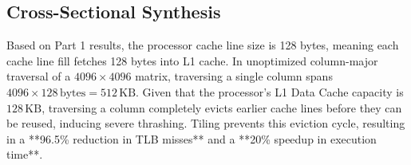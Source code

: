 \documentclass{article}
\begin{document}
	\begin{table}[htbp]
		\centering
		\caption{Hardware Counter Metrics Comparison}
		\label{tab:hardware_counters_comparison}
	\end{table}
	\FloatBarrier
	
	\subsection{Cross-Sectional Synthesis}
	Based on Part 1 results, the processor cache line size is 128 bytes, meaning each cache line fill fetches 128 bytes into L1 cache. In unoptimized column-major traversal of a $4096 \times 4096$ matrix, traversing a single column spans $4096 \times 128\,\text{bytes} = 512\,\text{KB}$. Given that the processor's L1 Data Cache capacity is $128\,\text{KB}$, traversing a column completely evicts earlier cache lines before they can be reused, inducing severe thrashing. Tiling prevents this eviction cycle, resulting in a **96.5\% reduction in TLB misses** and a **20\% speedup in execution time**.
	
\end{document}
